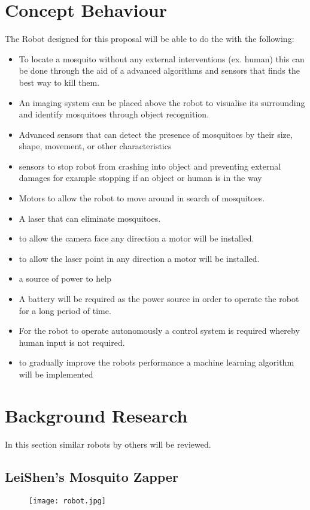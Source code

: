 \documentclass[11pt]{article}
\begin{document}
		\section{Concept Behaviour}
	The Robot designed for this proposal will be able to do the with the following:
	\begin{itemize}
		\item To locate a mosquito without any external interventions (ex. human) this can be done through the aid of a advanced algorithms and sensors that finds the best way to kill them. 
		\item An imaging system can be placed above the robot to visualise its surrounding and identify mosquitoes through object recognition.
		\item Advanced sensors that can detect the presence of mosquitoes by their size, shape, movement, or other characteristics
		\item sensors to  stop robot from crashing into object and preventing external damages for example stopping if an object or human is in the way 
		\item Motors to allow the robot to move around in search of mosquitoes.
		\item A laser that can eliminate mosquitoes.
		\item to allow the camera face any direction a motor will be installed.
		\item to allow the laser point in any direction a motor will be installed.
		\item a source of power to help 
		\item A battery will be required as the power source in order to operate the robot for a long period of time.
		\item For the robot to operate autonomously a control system is required whereby human input is not required.
		\item to gradually improve the robots performance a machine learning algorithm will be implemented
		
	\end{itemize}
	
	
	\section{Background Research}
In this section similar robots by others will be reviewed.

 	\subsection{LeiShen's Mosquito Zapper}
 	  \begin{center}
 	\begin{figure}[H]
 		\centering
 		\texttt{[image: robot.jpg]}
 		
 	\end{figure}
 \end{center}
 
\end{document}

